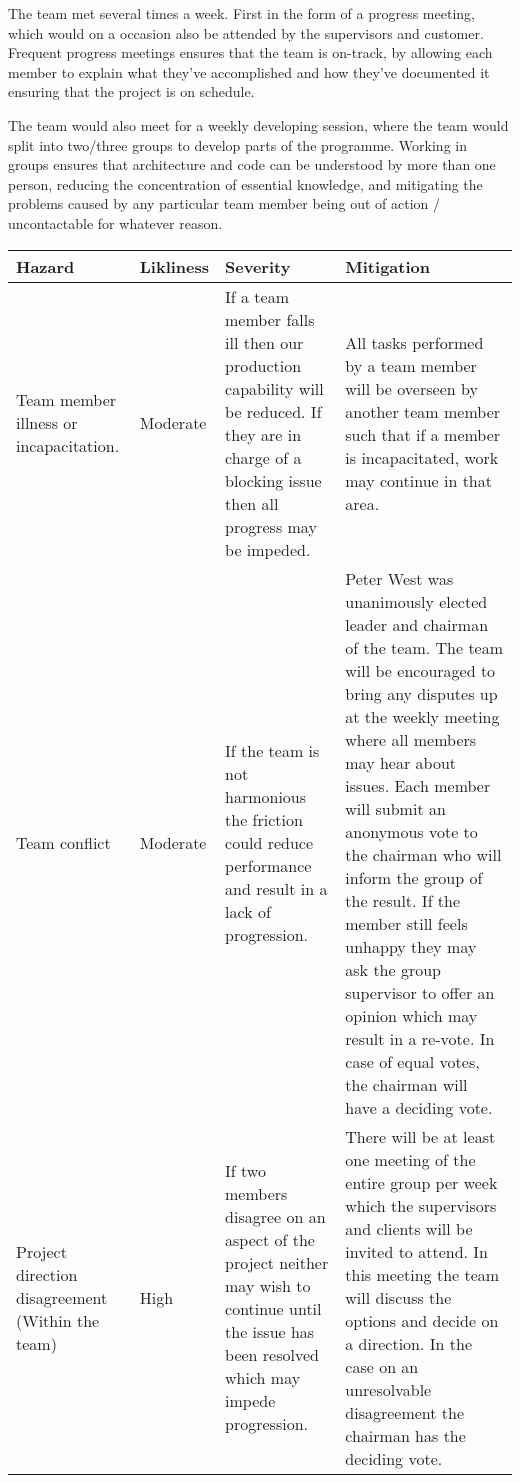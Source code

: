 The team met several times a week. First in the form of a progress meeting, which would on a occasion also be attended by the supervisors and customer. Frequent progress meetings ensures that the team is on-track, by allowing each member to explain what they've accomplished and how they've documented it ensuring that the project is on schedule.
 
The team would also meet for a weekly developing session, where the team would split into two/three groups to develop parts of the programme. Working in groups ensures that architecture and code can be understood by more than one person, reducing the concentration of essential knowledge, and mitigating the problems caused by any particular team member being out of action / uncontactable for whatever reason.

\begin{center}
\begin{landscape}
 \begin{longtable}{>{\raggedright}p{3cm} >{\raggedright}p{2cm} >{\raggedright}p{7cm} p{11cm}}
 \toprule
 \textbf{Hazard} &
 \textbf{Likliness} &
 \textbf{Severity} &
 \textbf{Mitigation}\\
     \toprule
        Team member illness or incapacitation. &
        Moderate &
		If a team member falls ill then our production capability will be reduced. If they are in charge of a blocking issue then all progress may be impeded. &
		All tasks performed by a team member will be overseen by another team member such that if a member is incapacitated, work may continue in that area. \\ 
     \midrule
        Team conflict &
        Moderate &
		If the team is not harmonious the friction could reduce performance and result in a lack of progression.  &
		Peter West was unanimously elected leader and chairman of the team. The team will be encouraged to bring any disputes up at the weekly meeting where all members may hear about issues. Each member will submit an anonymous vote to the chairman who will inform the group of the result. If the member still feels unhappy they may ask the group supervisor to offer an opinion which may result in a re-vote. In case of equal votes, the chairman will have a deciding vote. \\ 
     \midrule
        Project direction disagreement (Within the team) &
        High &
		If two members disagree on an aspect of the project neither may wish to continue until the issue has been resolved which may impede progression.  &
		There will be at least one meeting of the entire group per week which the supervisors and clients will be invited to attend. In this meeting the team will discuss the options and decide on a direction. In the case on an unresolvable disagreement the chairman has the deciding vote. \\ 

\end{longtable}
\end{landscape}
\end{center}
